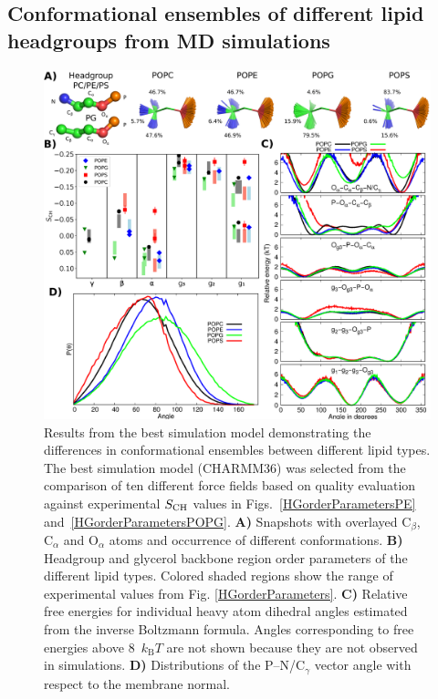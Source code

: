 \documentclass[journal=jpcbfk,manuscript=article]{achemso}
\begin{document}
\subsection{Conformational ensembles of different lipid headgroups from MD simulations}

\begin{figure}
  \centering
   \includegraphics[width=\textwidth]{./Figs/figure2.eps}
   \caption{\label{structures}
     Results from the best simulation model demonstrating the differences in conformational ensembles between different lipid types.
     The best simulation model (CHARMM36) was selected from the comparison of ten different force fields based on quality evaluation against experimental $S_{\rm{CH}}$ values in Figs.~\ref{HGorderParametersPE} and~\ref{HGorderParametersPOPG}.
     \textbf{A)} Snapshots with overlayed C$_\beta$, C$_\alpha$ and O$_\alpha$ atoms and occurrence of different conformations.
     \textbf{B)} Headgroup and glycerol backbone region order parameters of the different lipid types. Colored shaded regions show the range of experimental values from Fig. \ref{HGorderParameters}.
     \textbf{C)} Relative free energies for individual heavy atom dihedral angles estimated from the inverse Boltzmann formula.
     Angles corresponding to free energies above 8~$k_\mathrm{B}T$ are not shown because they are not observed in simulations.
     \textbf{D)} Distributions of the P--N/C$_\gamma$ vector angle with respect to the membrane normal.
  }
\end{figure}
\end{document}
